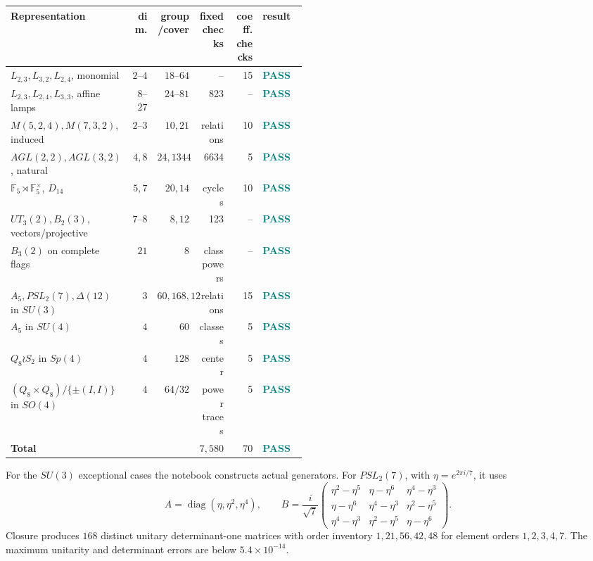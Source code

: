 \documentclass[10pt]{article}
\newcommand{\F}{\mathbb F}
\begin{document}
\begin{longtable}{@{}p{0.34\linewidth}rrrrp{0.15\linewidth}@{}}
\toprule
Representation & dim. & group/cover & fixed checks & coeff. checks & result\\
\midrule
\endhead
$L_{2,3},L_{3,2},L_{2,4}$, monomial & $2$--$4$ & $18$--$64$ & -- &15&\textcolor{teal}{\textbf{PASS}}\\
$L_{2,3},L_{2,4},L_{3,3}$, affine lamps &$8$--$27$&$24$--$81$&823&--&\textcolor{teal}{\textbf{PASS}}\\
$M(5,2,4),M(7,3,2)$, induced &$2$--$3$&$10,21$&relations&10&\textcolor{teal}{\textbf{PASS}}\\
$AGL(2,2),AGL(3,2)$, natural &$4,8$&$24,1344$&6634&5&\textcolor{teal}{\textbf{PASS}}\\
$\F_5\rtimes\F_5^\times$, $D_{14}$ &$5,7$&$20,14$&cycles&10&\textcolor{teal}{\textbf{PASS}}\\
$UT_3(2),B_2(3)$, vectors/projective &$7$--$8$&$8,12$&123&--&\textcolor{teal}{\textbf{PASS}}\\
$B_3(2)$ on complete flags &$21$&$8$&class powers&--&\textcolor{teal}{\textbf{PASS}}\\
$A_5,PSL_2(7),\Delta(12)$ in $SU(3)$ &$3$&$60,168,12$&relations&15&\textcolor{teal}{\textbf{PASS}}\\
$A_5$ in $SU(4)$ &$4$&$60$&classes&5&\textcolor{teal}{\textbf{PASS}}\\
$Q_8\wr S_2$ in $Sp(4)$ &$4$&$128$&center&5&\textcolor{teal}{\textbf{PASS}}\\
$(Q_8\times Q_8)/\{\pm(I,I)\}$ in $SO(4)$ &$4$&$64/32$&power traces&5&\textcolor{teal}{\textbf{PASS}}\\
\midrule
\textbf{Total}&&&\textbf{$7{,}580$}&\textbf{$70$}&\textcolor{teal}{\textbf{PASS}}\\
\bottomrule
\end{longtable}

For the $SU(3)$ exceptional cases the notebook constructs actual generators.
For $PSL_2(7)$, with $\eta=e^{2\pi i/7}$, it uses
\[
 A=\operatorname{diag}(\eta,\eta^2,\eta^4),\qquad
 B=\frac{i}{\sqrt7}
 \begin{pmatrix}
 \eta^2-\eta^5&\eta-\eta^6&\eta^4-\eta^3\\
 \eta-\eta^6&\eta^4-\eta^3&\eta^2-\eta^5\\
 \eta^4-\eta^3&\eta^2-\eta^5&\eta-\eta^6
 \end{pmatrix}.
\]
Closure produces $168$ distinct unitary determinant-one matrices with order
inventory $1,21,56,42,48$ for element orders $1,2,3,4,7$.  The maximum
unitarity and determinant errors are below $5.4\times10^{-14}$.
\end{document}
